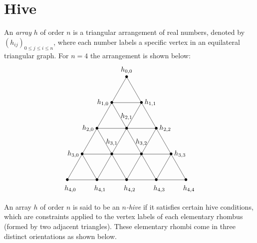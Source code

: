 \documentclass[11pt,reqno]{amsart}
\begin{document}
\section{Hive}
\label{sec:hive}
An {\em array} $h$ of order $n$ is a triangular arrangement of real numbers, denoted by $(h_{i j})_{0 \leq j \leq i \leq n}$, where each number labels a specific vertex in an equilateral triangular graph. For $n = 4$ the arrangement is shown below:
$$
\begin{tikzpicture}[scale=1.5]
    \node at (0,0) {$\bullet$};
    \node at (1,0) {$\bullet$};
    \node at (2,0) {$\bullet$};
    \node at (3,0) {$\bullet$};
    \node at (4,0) {$\bullet$};
    \node at (0.5,0.5*1.732) {$\bullet$};
    \node at (1.5,0.5*1.732) {$\bullet$};
    \node at (2.5,0.5*1.732) {$\bullet$};
    \node at (3.5,0.5*1.732) {$\bullet$};
    \node at (1,1.732) {$\bullet$};
    \node at (2,1.732) {$\bullet$};
    \node at (3,1.732) {$\bullet$};
    \node at (1.5,1.5*1.732) {$\bullet$};
    \node at (2.5,1.5*1.732) {$\bullet$};
    \node at (2,2*1.732) {$\bullet$};
    \node at (2,2.13*1.732) {$h_{0,0}$};
    \node at (1.2,1.5*1.732) {$h_{1,0}$};
    \node at (2.8,1.5*1.732) {$h_{1,1}$};
    \node at (1-0.3,1.732) {$h_{2,0}$};
    \node at (2,1.732+0.4) {$h_{2,1}$};
    \node at (3+0.3,1.732) {$h_{2,2}$};
    \node at (0.2,0.5*1.732) {$h_{3,0}$};
    \node at (1.5,0.5*1.732+0.4) {$h_{3,1}$};
    \node at (2.5,0.5*1.732+0.4) {$h_{3,2}$};
    \node at (4-0.2,0.5*1.732) {$h_{3,3}$};
    \node at (0.1,-0.3) {$h_{4,0}$};
    \node at (1.1,-0.3) {$h_{4,1}$};
    \node at (2.1,-0.3) {$h_{4,2}$};
    \node at (3.1,-0.3) {$h_{4,3}$};
    \node at (4.1,-0.3) {$h_{4,4}$};
    \draw (0,0) -- (4,0);
    \draw (0.5, 0.5*1.732) -- (3.5, 0.5*1.732);
    \draw (1, 1.732) -- (2, 1.732) -- (3, 1.732);
    \draw (1.5, 1.5*1.732) -- (2.5, 1.5*1.732);
    \draw (0,0) -- (0.5, 0.5*1.732) -- (1, 1.732) -- (1.5, 1.5*1.732) -- (2, 2*1.732);
    \draw (1,0) -- (1.5, 0.5* 1.732) -- (2, 1.732) -- (2.5, 1.5*1.732);
    \draw (2,0) -- (2.5, 0.5* 1.732) -- (3, 1.732);
    \draw (3,0) -- (3.5, 0.5* 1.732);
    \draw (1,0) -- (0.5, 0.5*1.732);
    \draw (2,0) -- (1.5, 0.5*1.732) -- (1,1.732);
    \draw (3,0) -- (2.5, 0.5*1.732);
    \draw (2.5, 0.5*1.732) -- (2, 1.732) -- (1.5, 1.5*1.732);
    \draw (4,0) -- (3.5, 0.5*1.732);
    \draw (3.5, 0.5*1.732) -- (3, 1.732) -- (2.5, 1.5*1.732) -- (2, 2*1.732);
\end{tikzpicture}
$$
An array $h$ of order $n$ is said to be an {\em $n$-hive} if it satisfies certain hive conditions, which are constraints applied to the vertex labels of each elementary rhombus (formed by two adjacent triangles). These elementary rhombi come in three distinct orientations as shown below.
\end{document}
